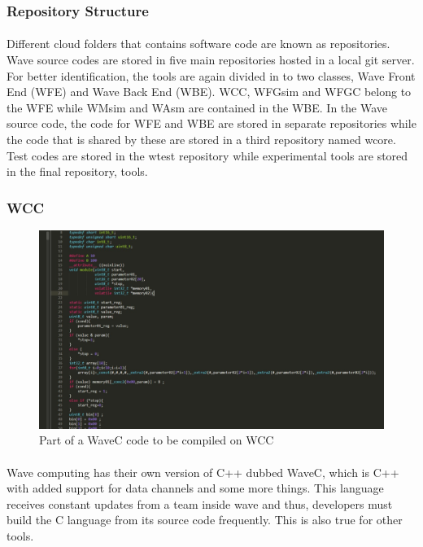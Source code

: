 \subsubsection{Repository Structure}
\paragraph{}
Different cloud folders that contains software code are known as repositories. Wave source codes are stored in five main repositories hosted in a local git server. For better identification, the tools are again divided in to two classes, Wave Front End (WFE) and Wave Back End (WBE). WCC, WFGsim and WFGC belong to the WFE while WMsim and WAsm are contained in the WBE. In the Wave source code, the code for WFE and WBE are stored in separate repositories while the code that is shared by these are stored in a third repository named wcore. Test codes are stored in the wtest repository while experimental tools are stored in the final repository, tools.

\subsubsection{WCC}

\begin{figure}[H]
    \centering
    \includegraphics[trim=0cm 0cm 0cm 0cm, clip=true,scale=0.5]{figures/wavec.jpg}
    \caption{Part of a WaveC code to be compiled on WCC\label{Fig:wavec}}\vspace{-4mm}
    \end{figure}

\paragraph{}
Wave computing has their own version of C++ dubbed WaveC, which is C++ with added support for data channels and some more things. This language receives constant updates from a team inside wave and thus, developers must build the C language from its source code frequently. This is also true for other tools.

